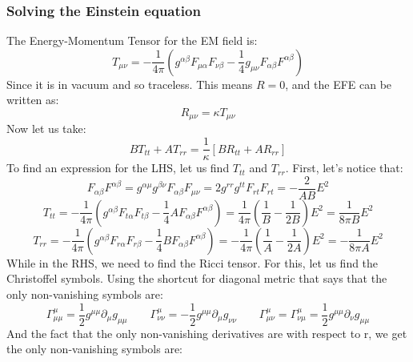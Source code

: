 \documentclass{article}
\begin{document}
\subsubsection{Solving the Einstein equation}
The Energy-Momentum Tensor for the EM field is:
\begin{equation}
    T_{\mu\nu} = -\frac{1}{4\pi}\left(g^{\alpha\beta}F_{\mu\alpha}F_{\nu\beta} - \frac{1}{4}g_{\mu\nu}F_{\alpha\beta}F^{\alpha\beta}\right)
\end{equation}
Since it is in vacuum and so traceless. This means $R = 0$, and the EFE can be written as:
\begin{equation}
    R_{\mu\nu} = \kappa T_{\mu\nu}
\end{equation}
Now let us take:
\begin{equation}
\label{eq:linear-combination}
    BT_{tt} + AT_{rr} = \frac{1}{\kappa}\left[BR_{tt} + AR_{rr}\right]
\end{equation}
To find an expression for the LHS, let us find $T_{tt}$ and $T_{rr}$. First, let's notice that:
\begin{equation}
    F_{\alpha\beta}F^{\alpha\beta} = g^{\alpha\mu}g^{\beta\nu}F_{\alpha\beta}F_{\mu\nu} = 2g^{rr}g^{tt}F_{rt}F_{rt} = -\frac{2}{AB}E^2
\end{equation}
\begin{equation}
    T_{tt} = -\frac{1}{4\pi}\left(g^{\alpha\beta}F_{t\alpha}F_{t\beta} - 
    \frac{1}{4}AF_{\alpha\beta}F^{\alpha\beta}\right) = 
    \frac{1}{4\pi}\left(\frac{1}{B} - \frac{1}{2B}\right)E^2 = \frac{1}{8\pi B}E^2
\end{equation}
\begin{equation}
    T_{rr} = -\frac{1}{4\pi}\left(g^{\alpha\beta}F_{r\alpha}F_{r\beta} - 
    \frac{1}{4}BF_{\alpha\beta}F^{\alpha\beta}\right) = 
    -\frac{1}{4\pi}\left(\frac{1}{A} - \frac{1}{2A}\right)E^2 = -\frac{1}{8\pi A}E^2
\end{equation}
While in the RHS, we need to find the Ricci tensor. For this, let us find the Christoffel symbols. Using the shortcut for diagonal metric that says that the only non-vanishing symbols are:
\begin{equation}
    \Gamma^\mu_{\mu\mu} = \frac{1}{2}g^{\mu\mu}\partial_{\mu}g_{\mu\mu}
    \qquad
    \Gamma^\mu_{\nu\nu} = -\frac{1}{2}g^{\mu\mu}\partial_{\mu}g_{\nu\nu}
    \qquad
    \Gamma^\mu_{\mu\nu} = \Gamma^\mu_{\nu\mu} = \frac{1}{2}g^{\mu\mu}\partial_{\nu}g_{\mu\mu}
\end{equation}
And the fact that the only non-vanishing derivatives are with respect to r, we get the only non-vanishing symbols are:
\end{document}
